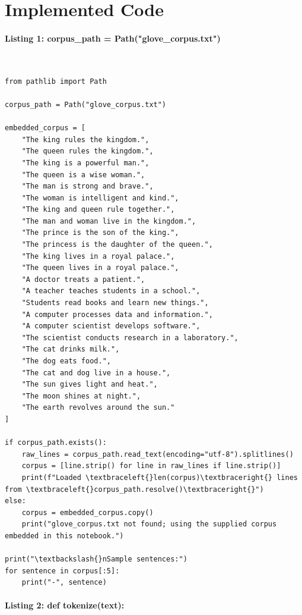 \documentclass[12pt,a4paper,oneside]{report}
\begin{document}
\section{Implemented Code}
\paragraph{Listing 1: corpus\_path = Path("glove\_corpus.txt")}\mbox{}\\[-1ex]
\begin{Verbatim}[commandchars=\\\{\},breaklines=true,breakanywhere=true,fontsize=\scriptsize,frame=leftline,framesep=2mm,rulecolor=\color{gray}]
from pathlib import Path

corpus_path = Path("glove_corpus.txt")

embedded_corpus = [
    "The king rules the kingdom.",
    "The queen rules the kingdom.",
    "The king is a powerful man.",
    "The queen is a wise woman.",
    "The man is strong and brave.",
    "The woman is intelligent and kind.",
    "The king and queen rule together.",
    "The man and woman live in the kingdom.",
    "The prince is the son of the king.",
    "The princess is the daughter of the queen.",
    "The king lives in a royal palace.",
    "The queen lives in a royal palace.",
    "A doctor treats a patient.",
    "A teacher teaches students in a school.",
    "Students read books and learn new things.",
    "A computer processes data and information.",
    "A computer scientist develops software.",
    "The scientist conducts research in a laboratory.",
    "The cat drinks milk.",
    "The dog eats food.",
    "The cat and dog live in a house.",
    "The sun gives light and heat.",
    "The moon shines at night.",
    "The earth revolves around the sun."
]

if corpus_path.exists():
    raw_lines = corpus_path.read_text(encoding="utf-8").splitlines()
    corpus = [line.strip() for line in raw_lines if line.strip()]
    print(f"Loaded \textbraceleft{}len(corpus)\textbraceright{} lines from \textbraceleft{}corpus_path.resolve()\textbraceright{}")
else:
    corpus = embedded_corpus.copy()
    print("glove_corpus.txt not found; using the supplied corpus embedded in this notebook.")

print("\textbackslash{}nSample sentences:")
for sentence in corpus[:5]:
    print("-", sentence)
\end{Verbatim}
\paragraph{Listing 2: def tokenize(text):}\mbox{}\\[-1ex]
\end{document}
